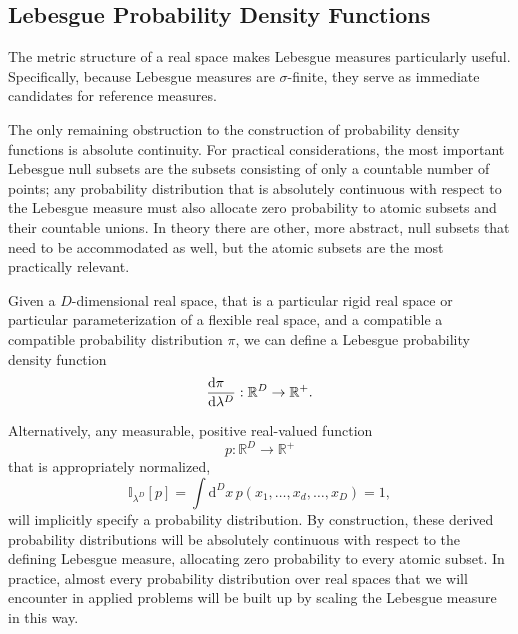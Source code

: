 \documentclass[
  letterpaper,
  DIV=11,
  numbers=noendperiod]{scrartcl}
\begin{document}
\subsection{Lebesgue Probability Density
Functions}\label{lebesgue-probability-density-functions}

The metric structure of a real space makes Lebesgue measures
particularly useful. Specifically, because Lebesgue measures are
\(\sigma\)-finite, they serve as immediate candidates for reference
measures.

The only remaining obstruction to the construction of probability
density functions is absolute continuity. For practical considerations,
the most important Lebesgue null subsets are the subsets consisting of
only a countable number of points; any probability distribution that is
absolutely continuous with respect to the Lebesgue measure must also
allocate zero probability to atomic subsets and their countable unions.
In theory there are other, more abstract, null subsets that need to be
accommodated as well, but the atomic subsets are the most practically
relevant.

Given a \(D\)-dimensional real space, that is a particular rigid real
space or particular parameterization of a flexible real space, and a
compatible a compatible probability distribution \(\pi\), we can define
a Lebesgue probability density function \[
\frac{
  \mathrm{d} \pi \hphantom{ {}^{D} }
}{
  \mathrm{d} \lambda^{D}
} :
\mathbb{R}^{D} \rightarrow \mathbb{R}^{+}.
\]

Alternatively, any measurable, positive real-valued function \[
p : \mathbb{R}^{D} \rightarrow \mathbb{R}^{+}
\] that is appropriately normalized, \[
\mathbb{I}_{\lambda^{D}}[ p ]
= \int \mathrm{d}^{D} x \, p(x_{1}, \ldots, x_{d}, \ldots, x_{D})
= 1,
\] will implicitly specify a probability distribution. By construction,
these derived probability distributions will be absolutely continuous
with respect to the defining Lebesgue measure, allocating zero
probability to every atomic subset. In practice, almost every
probability distribution over real spaces that we will encounter in
applied problems will be built up by scaling the Lebesgue measure in
this way.
\end{document}
